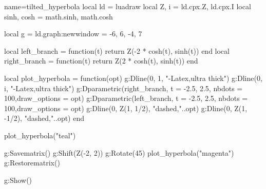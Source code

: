 \documentclass{standalone}
\begin{document}
\begin{luadraw}{name=tilted_hyperbola}
local ld = luadraw
local Z, i = ld.cpx.Z, ld.cpx.I
local sinh, cosh = math.sinh, math.cosh

local g = ld.graph:new{window = {-6, 6, -4, 7}}

local left_branch = function(t) return Z(-2 * cosh(t), sinh(t)) end
local right_branch = function(t) return Z(2 * cosh(t), sinh(t)) end

local plot_hyperbola = function(opt)
    g:Dline({0, 1}, "-Latex,ultra thick")
    g:Dline({0, i}, "-Latex,ultra thick")
    g:Dparametric(right_branch, {t = {-2.5, 2.5}, nbdots = 100,draw_options = opt})
    g:Dparametric(left_branch, {t = {-2.5, 2.5}, nbdots = 100,draw_options = opt})
    g:Dline({0, Z(1, 1/2)}, "dashed,"..opt)
    g:Dline({0, Z(1, -1/2)}, "dashed,"..opt)
end

plot_hyperbola("teal")

g:Savematrix()
g:Shift(Z(-2, 2))
g:Rotate(45)
plot_hyperbola("magenta")
g:Restorematrix()

g:Show()
\end{luadraw}
\end{document}
